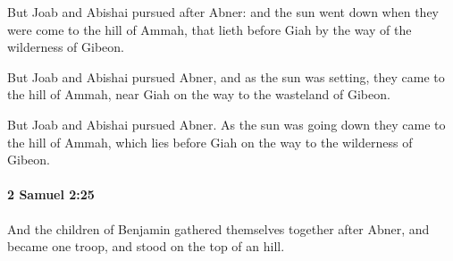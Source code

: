 			\begin{versebox}
					\item[BHS] 
					\item[ASV] But Joab and Abishai pursued after Abner: and the sun went down when they were come to the hill of Ammah, that lieth before Giah by the way of the wilderness of Gibeon.
					\item[NIV] But Joab and Abishai pursued Abner, and as the sun was setting, they came to the hill of Ammah, near Giah on the way to the wasteland of Gibeon.
					\item[NRSV] But Joab and Abishai pursued Abner. As the sun was going down they came to the hill of Ammah, which lies before Giah on the way to the wilderness of Gibeon.
			\end{versebox}

		\paragraph{2 Samuel 2:25} %
			\label{2SAMUEL-2-25}

			And the children of Benjamin gathered themselves together after Abner, and became one troop, and stood on the top of an hill.

